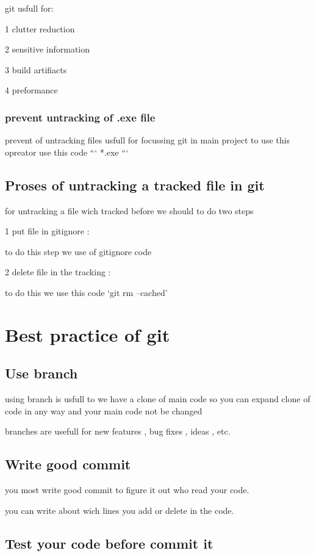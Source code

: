 \documentclass{article}
\begin{document}
git usfull for:

1 clutter reduction

2 sensitive information

3 build artifiacts

4 preformance



\subsubsection*{prevent untracking of .exe file}

prevent of untracking files usfull for focussing git in main project
 to use this opreator use this code
 ``` *.exe ```

\subsection{Proses of untracking a tracked file in git}

for untracking a file
 wich tracked before we should to do two steps

1 put file in gitignore :

to do this step we use of gitignore code

2 delete file in the tracking :

to do this we use this code
`git rm --cached'
 \newpage
\section*{Best practice of git}

\subsection{Use branch}

using branch is usfull to we have a clone of main code so you can expand clone of code in any way and your main code not be changed 

branches are usefull for new features , bug fixes , ideas , etc.

\subsection{Write good commit}

you most write good commit to figure it out who read your code.

you can write about wich lines you add or delete in the code.

\subsection{Test your code before commit it}
\end{document}
